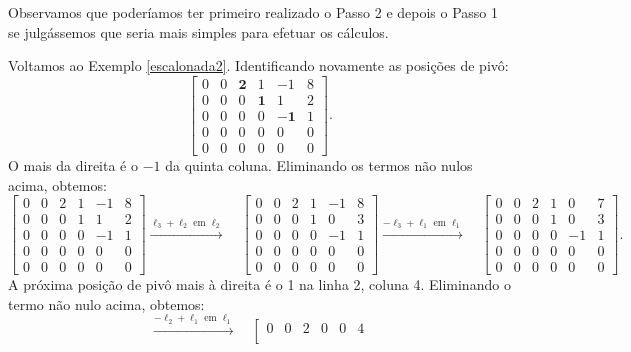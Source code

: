 Observamos que poderíamos ter primeiro realizado o Passo 2 e depois o Passo 1 se julgássemos que seria mais simples para efetuar os cálculos.

\begin{ex}
    Voltamos ao Exemplo \ref{escalonada2}. Identificando novamente as posições de pivô:
\begin{equation}
\left[
\begin{array}{cccccc}
   0&0&\mathbf{2}&1&-1&8\\
   0&0&0&\mathbf{1}&1&2\\
   0&0&0&0&\mathbf{-1}&1\\
   0&0&0&0&0&0\\
   0&0&0&0&0&0
\end{array}
\right].
\end{equation} O mais da direita é o $-1$ da quinta coluna. Eliminando os termos não nulos acima, obtemos:
\begin{equation}
\left[
\begin{array}{cccccc}
   0&0&2&1&-1&8\\
   0&0&0&1&1&2\\
   0&0&0&0&-1&1\\
   0&0&0&0&0&0\\
   0&0&0&0&0&0
\end{array}
\right]
\xrightarrow{\ell_3 + \ell_2 \text{ em } \ell_2} \quad
\left[
\begin{array}{cccccc}
   0&0&2&1&-1&8\\
   0&0&0&1&0&3\\
   0&0&0&0&-1&1\\
   0&0&0&0&0&0\\
   0&0&0&0&0&0
\end{array}
\right]
\xrightarrow{-\ell_3 + \ell_1 \text{ em } \ell_1} \quad
\left[
\begin{array}{cccccc}
   0&0&2&1&0&7\\
   0&0&0&1&0&3\\
   0&0&0&0&-1&1\\
   0&0&0&0&0&0\\
   0&0&0&0&0&0
\end{array}
\right].
\end{equation} A próxima posição de pivô mais à direita é o 1 na linha 2, coluna 4. Eliminando o termo não nulo acima, obtemos:
\begin{equation}
\xrightarrow{-\ell_2 + \ell_1 \text{ em } \ell_1} \quad
\left[
\begin{array}{cccccc}
   0&0&2&0&0&4\\

\end{array}
\end{equation}
\end{ex}
